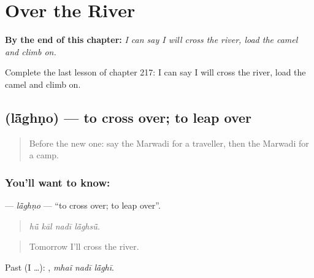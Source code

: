 
\chapter{Over the River}
\label{ch:mw-over-the-river}

\begin{chapteropening}
\textbf{By the end of this chapter:} \emph{I can say I will cross the river, load the camel and climb on.}

Complete the last lesson of chapter 217: I can say I will cross the river, load the camel and climb on.
\end{chapteropening}

\section[\texorpdfstring{\mw{लांघणो} (lā̃ghṇo)}{लांघणो (lā̃ghṇo)}]{ (lā̃ghṇo) — to cross over; to leap over}

\label{lesson:MW-C217-laghno}



\begin{quote}
Before the new one: say the Marwadi for a traveller, then the Marwadi for a camp.
\end{quote}

\subsection*{You'll want to know: }
\textbf{} — \emph{lā̃ghṇo} — \textquotedblleft{}to cross over; to leap over\textquotedblright{}.

\begin{quote}
   
\end{quote}

\begin{quote}
\emph{hū̃ kāl nadī lā̃ghsū̃.}
\end{quote}

\begin{quote}
Tomorrow I'll cross the river.
\end{quote}

Past (I …):   , \emph{mhaĩ nadī lā̃ghī}.

